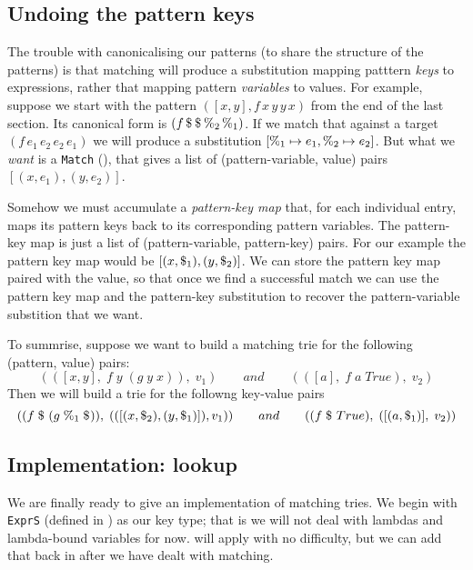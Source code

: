 \documentclass[acmsmall]{acmart}
\theoremstyle{theorem}
\theoremstyle{definition}
\theoremstyle{remark}
\begin{document}
\subsection{Undoing the pattern keys} \label{sec:patkeymap}

The trouble with canonicalising our patterns (to share the structure of the patterns)
is that matching will produce a substitution mapping patttern \emph{keys} to
expressions, rather that mapping pattern \emph{variables} to values.  For example,
suppose we start with the pattern $([x,y], f \,x\, y\, y\, x)$ from the
end of the last section. Its canonical form is $(f \,\$_{}\, \$_{}\, \%_{2}\, \%_{1})$.
If we match that against a target $(f\,e_1\,e_2\,e_2\,e_1)$ we will produce a substitution $[\%_{1} \mapsto e_1, \%_{2} \mapsto e_2]$.
But  what we \emph{want} is a \lstinline{Match} (),
that gives a list of (pattern-variable, value) pairs $[(x, e_1), (y,e_2)]$.

Somehow we must accumulate a \emph{pattern-key map} that, for each
individual entry, maps its pattern keys back to its corresponding
pattern variables.  The pattern-key map is just a list of (pattern-variable, pattern-key) pairs.
For our example the pattern key map would be
$[(x, \$_{1}), (y,\$_{2})]$.  We can store the pattern key
map paired with the value, so that once we find a successful match we can use the pattern
key map and the pattern-key substitution to recover the pattern-variable substition that we want.

To summrise, suppose we want to build a matching trie for the following (pattern, value) pairs:
$$
(([x,y],\; f\;y\;(g\;y\;x)),\; v_1) \qquad and \qquad (([a],\; f\;a\;True),\;v_2)
$$
Then we will build a trie for the followng key-value pairs
$$
( (f \;\$_{}\;(g\;\%_{1}\;\$_{})),\; (([(x,\$_{2}),(y,\$_{1})]), v_1) )
  \qquad and \qquad
( (f \;\$_{}\;True),\; ([(a,\$_{1})],\;v_2) )
$$


\subsection{Implementation: lookup}

We are finally ready to give an implementation of matching tries.
We begin with \lstinline{ExprS} (defined in ) as our key type;
that is we will not deal with lambdas and lambda-bound variables for now.
 will apply with no difficulty, but we can add that back
in after we have dealt with matching.
\end{document}
